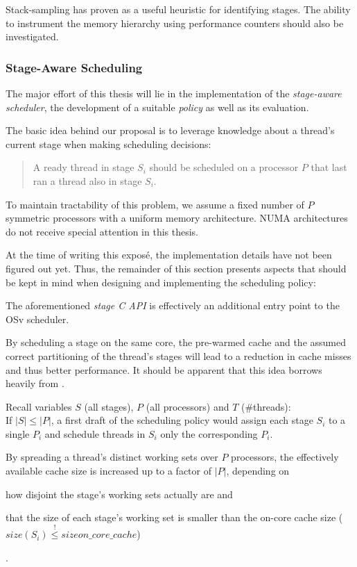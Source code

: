 \documentclass{article}
\begin{document}
Stack-sampling has proven as a useful heuristic for identifying stages.
The ability to instrument the memory hierarchy using performance counters should also be investigated.

\subsubsection{Stage-Aware Scheduling}\label{stageawaresched}

The major effort of this thesis will lie in the implementation of the \emph{stage-aware scheduler}, the development of a suitable \emph{policy} as well as its evaluation.

The basic idea behind our proposal is to leverage knowledge about a thread's current stage when making scheduling decisions:
\begin{quote} %
A ready thread in stage $S_i$ should be scheduled on a processor $P$ that last ran a thread also in stage $S_i$.
\end{quote}

To maintain tractability of this problem, we assume a fixed number of $P$ symmetric processors with a uniform memory architecture.
NUMA architectures do not receive special attention in this thesis. %

At the time of writing this exposé, the implementation details have not been figured out yet.
Thus, the remainder of this section presents aspects that should be kept in mind when designing and implementing the scheduling policy:

The aforementioned \textit{stage C API} is effectively an additional entry point to the OSv scheduler.

By scheduling a stage on the same core, the pre-warmed cache and
the assumed correct partitioning of the thread's stages
will lead to a reduction in cache misses and thus better performance.
It should be apparent that this idea borrows heavily from \cite{sodaspr,cohort}.

Recall variables \textbf{$S$} (all stages), \textbf{$P$} (all processors) and \textbf{$T$} (\#threads):\\
If $|S| \le |P|$, a first draft of the scheduling policy would
assign each stage $S_i$ to a single $P_i$ and schedule threads in $S_i$ only the corresponding $P_i$.

By spreading a thread's distinct working sets over $P$ processors,
the effectively available cache size is increased up to a factor of $|P|$, depending on
\begin{enumerate*}
    \item how disjoint the stage's working sets actually are and
    \item that the size of each stage's working set is smaller than the on-core cache size ($size(S_i) \overset{!}{\le} size{on\_core\_cache}$)
\end{enumerate*}.
\end{document}
